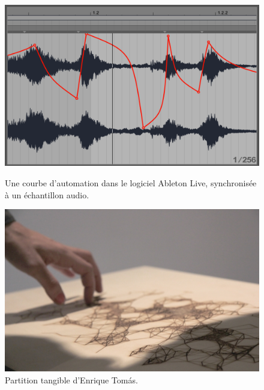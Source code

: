 \begin{figure}[!htbp]
	\captionsetup{format=plain}%
	\centering
	\begin{minipage}[t]{0.48\textwidth}
		\includegraphics[width=\linewidth]{gfx/03_gesture/AbletonLiveAutomation_72dpi.png}
		\caption[Une courbe d'automation dans le logiciel Ableton Live]{Une courbe d'automation dans le logiciel Ableton Live, synchronisée à un échantillon audio.}
		\label{fig:gesture:automation}
	\end{minipage}
	\hspace{.02\linewidth}
	\begin{minipage}[t]{0.48\textwidth}
	  \includegraphics[width=\linewidth]{gfx/03_gesture/EnriqueThomas-TangibleScore.jpg}
		\caption[Partition tangible d'Enrique Tomás]{Partition tangible d'Enrique Tomás.}
		\label{fig:gesture:tangible_score}
	\end{minipage}
\end{figure}
